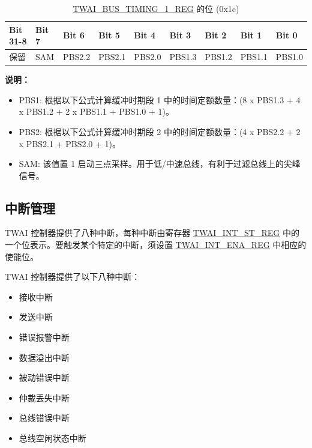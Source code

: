 \documentclass[main\_\_CN.tex]{subfiles}
\begin{document}
\begin{longtable}[c]{|p{1.4cm}|p{1.4cm}|p{1.4cm}|p{1.4cm}|p{1.4cm}|p{1.4cm}|p{1.4cm}|p{1.4cm}|p{1.4cm}|}
    \caption{\hyperref[regdesc:TWAIBUSTIMING1REG]{TWAI\_BUS\_TIMING\_1\_REG} 的位 (0x1c)}
    \label{tab:twai-bit-info-bus-timing-1-reg}\\
    \hline
       \rowcolor{lightgray}
   \textbf{Bit 31-8} & \textbf{Bit 7} & \textbf{Bit 6} & \textbf{Bit 5} & \textbf{Bit 4} & \textbf{Bit 3} & \textbf{Bit 2} & \textbf{Bit 1} & \textbf{Bit 0}\\\hline 
   保留 & SAM & PBS2.2 & PBS2.1 & PBS2.0 & PBS1.3 &PBS1.2 & PBS1.1 & PBS1.0\\
    \hline
\end{longtable}
\vspace{-1.5em}
{\bfseries 说明：}\\
\begin{itemize}
    \item PBS1: 根据以下公式计算缓冲时期段 1 中的时间定额数量：(8 x PBS1.3 + 4 x PBS1.2 + 2 x PBS1.1 + PBS1.0 + 1)。
    \item PBS2: 根据以下公式计算缓冲时期段 2 中的时间定额数量：(4 x PBS2.2 + 2 x PBS2.1 + PBS2.0 + 1)。
    \item SAM: 该值置 1 启动三点采样。用于低/中速总线，有利于过滤总线上的尖峰信号。
\end{itemize}

\subsection{中断管理}
\label{sec:twai-interrupt-management}
\chipname{} TWAI 控制器提供了八种中断，每种中断由寄存器 \hyperref[regdesc:TWAIINTSTREG]{TWAI\_INT\_ST\_REG} 中的一个位表示。要触发某个特定的中断，须设置 \hyperref[regdesc:TWAIINTENAREG]{TWAI\_INT\_ENA\_REG} 中相应的使能位。

TWAI 控制器提供了以下八种中断：

\begin{itemize}
    \item 接收中断
    \item 发送中断
    \item 错误报警中断
    \item 数据溢出中断
    \item 被动错误中断
    \item 仲裁丢失中断
    \item 总线错误中断
    \item 总线空闲状态中断
\end{itemize}
\end{document}
